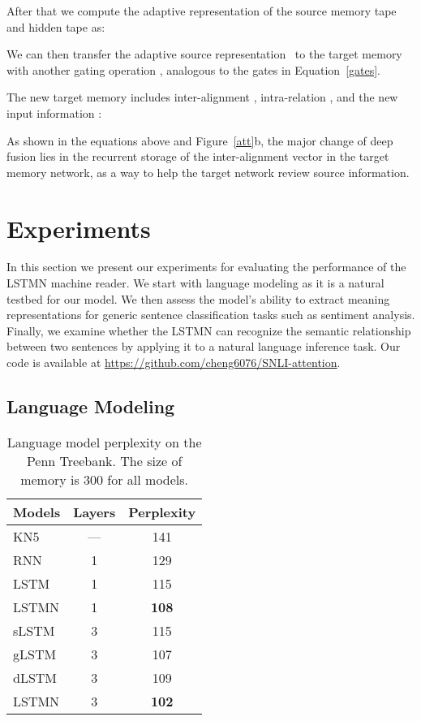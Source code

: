 \documentclass[11pt,letterpaper]{article}
\begin{document}
	
	After that we compute the adaptive representation of the source memory
        tape  and hidden tape  as:
	
	We can then transfer the adaptive source
        representation~ to the target memory with
        another gating operation , analogous to the gates in
        Equation~\eqref{gates}.
		
                The new target memory includes inter-alignment , intra-relation , and the new input information :
	
	 
As shown in the equations above and Figure~\ref{att}b, the
        major change of deep fusion lies in the recurrent storage of
        the inter-alignment vector in the target memory network, as a
        way to help the target network review source information.
	
	\section{Experiments}
	\label{sec:experiments}
	
	In this section we present our experiments for evaluating the
        performance of the LSTMN machine reader. We start with
        language modeling as it is a natural testbed for our model. We
        then assess the model's ability to extract meaning
        representations for generic sentence classification tasks such
        as sentiment analysis. Finally, we examine whether the LSTMN
        can recognize the semantic relationship between two sentences
        by applying it to a natural language inference task. Our code
        is available at
        \url{https://github.com/cheng6076/SNLI-attention}.
	
	\subsection{Language Modeling}
	\label{sec:language-modeling}
	


	\begin{table}[t]
		\centering
	    \small
		\begin{tabular}{|l|c|c|}
			\hline
			Models & Layers & Perplexity \\
			\hline\hline
			KN5 & --- & 141 \\\hline
			RNN & 1 & 129 \\
			LSTM & 1 & 115 \\
			LSTMN & 1 &  \textbf{108} \\
			\hline
			sLSTM & 3 &  115 \\ 
			gLSTM & 3 & 107 \\
			dLSTM & 3 & 109 \\
			LSTMN & 3 &  \textbf{102} \\
			\hline
		\end{tabular}
		\caption{Language model perplexity on 
                  the Penn Treebank. The size of memory is 300 for all
                  models.} 
		\label{lmr}
		\vspace{-2.5ex}
	\end{table}
	
\end{document}
